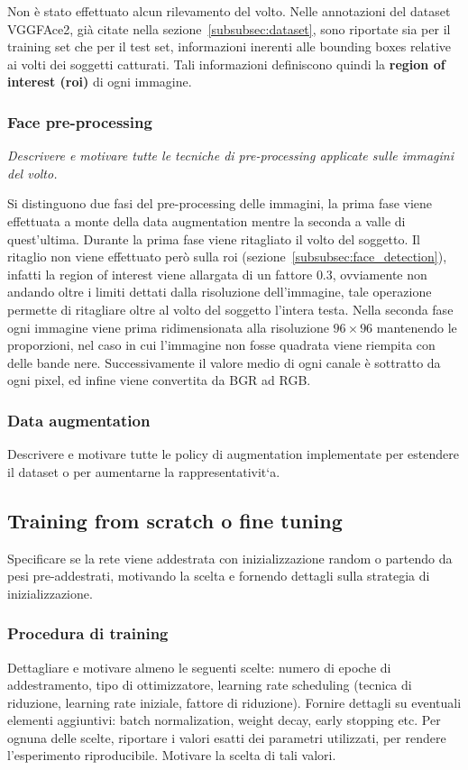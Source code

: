 Non è stato effettuato alcun rilevamento del volto. Nelle annotazioni del dataset VGGFAce2, già citate nella sezione~\ref{subsubsec:dataset}, sono riportate sia per il training set che per il test set, informazioni inerenti alle bounding boxes relative ai volti dei soggetti catturati. Tali informazioni definiscono quindi la \textbf{region of interest (\textbf{roi})} di ogni immagine.

\subsubsection{Face pre-processing} 

\emph{Descrivere e motivare tutte le tecniche di pre-processing applicate sulle immagini del volto.}

Si distinguono due fasi del pre-processing delle immagini, la prima fase viene effettuata a monte della data augmentation mentre la seconda a valle di quest'ultima.
Durante la prima fase viene ritagliato il volto del soggetto. Il ritaglio non viene effettuato però sulla roi (sezione~\ref{subsubsec:face_detection}), infatti la region of interest viene allargata di un fattore $0.3$, ovviamente non andando oltre i limiti dettati dalla risoluzione dell'immagine, tale operazione permette di ritagliare oltre al volto del soggetto l'intera testa.
Nella seconda fase ogni immagine viene prima ridimensionata alla risoluzione  $96 \times 96$ mantenendo le proporzioni, nel caso in cui l'immagine non fosse quadrata viene  riempita con delle bande nere. Successivamente il valore medio di ogni canale è sottratto da ogni pixel, ed infine viene convertita da BGR ad RGB.

\subsubsection{Data augmentation}
Descrivere e motivare tutte le policy di augmentation
implementate per estendere il dataset o per aumentarne la rappresentativit`a.

\subsection{Training from scratch o fine tuning}
Specificare se la rete viene addestrata
con inizializzazione random o partendo da pesi pre-addestrati, motivando la
scelta e fornendo dettagli sulla strategia di inizializzazione.

\subsubsection{Procedura di training}
Dettagliare e motivare almeno le seguenti scelte: numero di epoche di addestramento, tipo di ottimizzatore, learning rate scheduling (tecnica di riduzione, learning rate iniziale, fattore di riduzione). Fornire dettagli su eventuali elementi aggiuntivi: batch normalization, weight decay, early stopping etc. Per ognuna delle scelte, riportare i valori esatti dei parametri utilizzati, per rendere l’esperimento riproducibile. Motivare la scelta di tali valori.